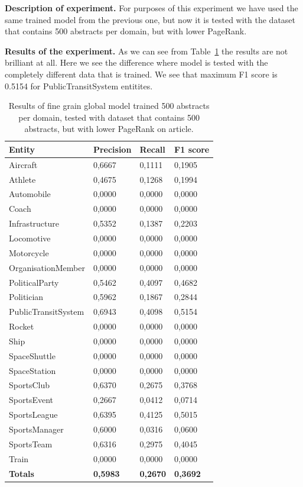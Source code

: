 \documentclass[thesis=M,english]{FITthesis}[2018/05/30]
\begin{document}
\textbf{Description of experiment.} For purposes of this experiment we have used the same trained model from the previous one, but now it is tested with the dataset that contains 500 abstracts per domain, but with lower PageRank.

\textbf{Results of the experiment.} As we can see from Table~\ref{table:Global500FineDomainTestedWithTwo500Datasets} the results are not brilliant at all. Here we see the difference where model is tested with the completely different data that is trained. We see that maximum F1 score is 0.5154 for PublicTransitSystem entitites. 

	\begin{table}[H]\centering
		\begin{tabular}{|l|l|l|l|}
			\hline {\textbf{Entity}} & {\textbf{Precision}} & {\textbf{Recall}} & {\textbf{F1 score}}\\\hline
				Aircraft & 0,6667 & 0,1111 & 0,1905\\
				Athlete & 0,4675 & 0,1268 & 0,1994\\
				Automobile & 0,0000 & 0,0000 & 0,0000\\ 
				Coach & 0,0000 & 0,0000 & 0,0000\\
				Infrastructure & 0,5352 & 0,1387 & 0,2203\\
				Locomotive & 0,0000 & 0,0000 & 0,0000\\
				Motorcycle & 0,0000 & 0,0000 & 0,0000\\
				OrganisationMember & 0,0000 & 0,0000 & 0,0000\\				
				PoliticalParty & 0,5462 & 0,4097 & 0,4682\\
				Politician & 0,5962 & 0,1867 & 0,2844\\
				PublicTransitSystem & 0,6943 & 0,4098 & 0,5154\\
				Rocket & 0,0000 & 0,0000 & 0,0000\\				
				Ship & 0,0000 & 0,0000 & 0,0000\\
				SpaceShuttle & 0,0000 & 0,0000 & 0,0000\\
				SpaceStation & 0,0000 & 0,0000 & 0,0000\\ 
				SportsClub & 0,6370 & 0,2675 & 0,3768\\
				SportsEvent & 0,2667 & 0,0412 & 0,0714\\
				SportsLeague & 0,6395 & 0,4125 & 0,5015\\
				SportsManager & 0,6000 & 0,0316 & 0,0600\\
				SportsTeam & 0,6316 & 0,2975 & 0,4045\\
				Train & 0,0000 & 0,0000 & 0,0000\\\hline
				\textbf{Totals} & \textbf{0,5983} & \textbf{0,2670} & \textbf{0,3692}\\\hline
		\end{tabular}
		\caption{Results of fine grain global model trained 500 abstracts per domain, tested with dataset that contains 500 abstracts, but with lower PageRank on article. \label{table:Global500FineDomainTestedWithTwo500Datasets}}
	\end{table}
\end{document}
